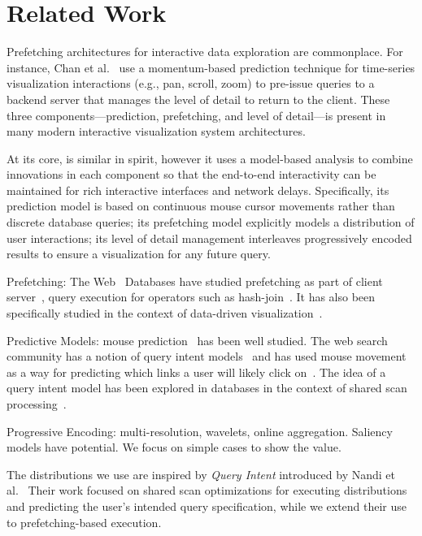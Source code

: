 \section{Related Work}

Prefetching architectures for interactive data exploration are commonplace.
For instance, Chan et al.~\cite{chan2008maintaining} use a momentum-based prediction technique for time-series visualization interactions (e.g., pan, scroll, zoom) to pre-issue queries to a backend server that manages the level of detail to return to the client.  These three components---prediction, prefetching, and level of detail---is present in many modern interactive visualization system architectures.

At its core, \sys is similar in spirit, however it uses a model-based analysis to combine innovations in each component so that the end-to-end interactivity can be maintained for rich interactive interfaces and network delays.  Specifically, its prediction model is based on continuous mouse cursor movements rather than discrete database queries; its prefetching model explicitly models a distribution of user interactions; its level of detail management interleaves progressively encoded results to ensure a visualization for any future query.

Prefetching: The Web~\cite{domenech2006web,nanopoulos2003data}
Databases have studied prefetching as part of client server~\cite{ramachandran2005dynamic,ramachandraholistic,sapia2000promise,smith1978sequentiality}, 
query execution for operators such as hash-join~\cite{chen2007improving}.
It has also been specifically studied in the context of data-driven visualization~\cite{jayachandran2014combining,battle2013scalar,battle2016dynamic,cetintemel2013query,debrabant2015seer}.

Predictive Models: mouse prediction~\cite{pasqual2014mouse,lane2005process,wobbrock2009angle,wobbrock2007gestures} has been well studied.
The web search community has a notion of query intent models~\cite{li2008learning} and has used mouse movement as a way for predicting which links a user will likely click on~\cite{guo2008exploring}.
The idea of a query intent model has been explored in databases in the context of shared scan processing~\cite{ebenstein2016fluxquery}.

Progressive Encoding: multi-resolution, wavelets, online aggregation.
Saliency models have potential.  We focus on simple cases to show the value.

The distributions we use are inspired by {\it Query Intent} introduced by Nandi et al.~\cite{ebenstein2016fluxquery,gesturequery} Their work focused on shared scan optimizations for executing distributions and predicting the user's intended query specification, while we extend their use to prefetching-based execution.

